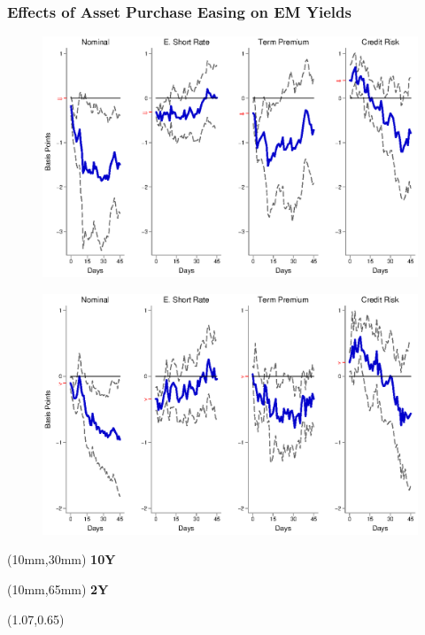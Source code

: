\documentclass[12pt, aspectratio=169, xcolor=dvipsnames]{beamer}
\begin{document}
\begin{frame}[label=LSAPEM]
\frametitle{Effects of Asset Purchase Easing on EM Yields}
\begin{figure}[!htbp]
\begin{center} %
\includegraphics[trim={0cm 0cm 0cm 0cm},clip,height=0.45\textheight,width=0.85\linewidth]{../Figures/LPs/LagDep-FX/LSAP/EM/LSAPEMnomyptpphi120m.eps}
\par\end{center}
\end{figure}
\vspace{-0.5cm}
\begin{figure}[!htbp]
\begin{center} %
\includegraphics[trim={0cm 0cm 0cm 0.76cm},clip,height=0.45\textheight,width=0.85\linewidth]{../Figures/LPs/LagDep-FX/LSAP/EM/LSAPEMnomyptpphi24m.eps}
\par\end{center}
\end{figure}
\begin{textblock*}{8mm}(10mm,30mm)
\small \textbf{10Y}
\end{textblock*}
\begin{textblock*}{8mm}(10mm,65mm)
\small \textbf{2Y}
\end{textblock*}
\begin{textblock*}{5cm}(1.07\textwidth,0.65\textheight)
\hyperlink{LSAPUS}{}
\end{textblock*}
\end{frame}
\end{document}
